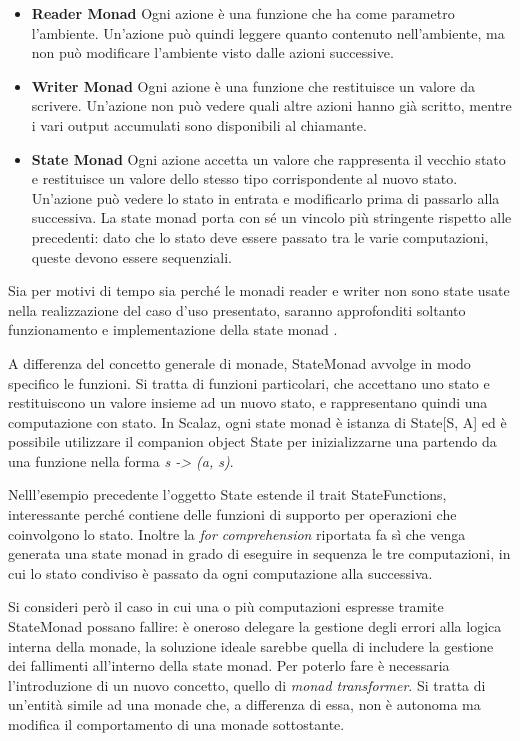 \begin{itemize}
\item \textbf{Reader Monad} Ogni azione è una funzione che ha come parametro l'ambiente. Un'azione può quindi leggere quanto contenuto nell'ambiente, ma non può modificare l'ambiente visto dalle azioni successive.
\item \textbf{Writer Monad} Ogni azione è una funzione che restituisce un valore da scrivere. Un'azione non può vedere quali altre azioni hanno già scritto, mentre i vari output accumulati sono disponibili al chiamante.
\item \textbf{State Monad} Ogni azione accetta un valore che rappresenta il vecchio stato e restituisce un valore dello stesso tipo corrispondente al nuovo stato. Un'azione può vedere lo stato in entrata e modificarlo prima di passarlo alla successiva. La state monad porta con sé un vincolo più stringente rispetto alle precedenti: dato che lo stato deve essere passato tra le varie computazioni, queste devono essere sequenziali.
\end{itemize}

Sia per motivi di tempo sia perché le monadi reader e writer non sono state usate nella realizzazione del caso d'uso presentato, saranno approfonditi soltanto funzionamento e implementazione della state monad \cite{ScalazStateMonad}.

A differenza del concetto generale di monade, StateMonad avvolge in modo specifico le funzioni. Si tratta di funzioni particolari, che accettano uno stato e restituiscono un valore insieme ad un nuovo stato, e rappresentano quindi una computazione con stato. In Scalaz, ogni state monad è istanza di State[S, A] ed è possibile utilizzare il companion object State per inizializzarne una partendo da una funzione nella forma \textit{s -> (a, s)}.



Nelll'esempio precedente l'oggetto State estende il trait StateFunctions, interessante perché contiene delle funzioni di supporto per operazioni che coinvolgono lo stato. Inoltre la \textit{for comprehension} riportata fa sì che venga generata una state monad in grado di eseguire in sequenza le tre computazioni, in cui lo stato condiviso è passato da ogni computazione alla successiva.



Si consideri però il caso in cui una o più computazioni espresse tramite StateMonad possano fallire: è oneroso delegare la gestione degli errori alla logica interna della monade, la soluzione ideale sarebbe quella di includere la gestione dei fallimenti all'interno della state monad. Per poterlo fare è necessaria l'introduzione di un nuovo concetto, quello di \textit{monad transformer}. Si tratta di un'entità simile ad una monade che, a differenza di essa, non è autonoma ma modifica il comportamento di una monade sottostante.

